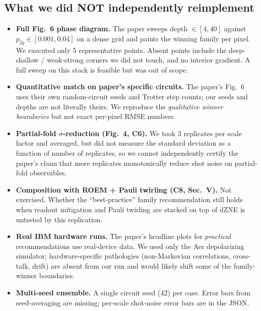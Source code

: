 \documentclass[11pt]{article}
\begin{document}
\subsection{What we did NOT independently reimplement}
\begin{itemize}
  \item \textbf{Full Fig.~6 phase diagram.} The paper sweeps depth $\in [4, 40]$
        against $p_{2q} \in [0.001, 0.04]$ on a dense grid and paints the winning
        family per pixel. We executed only 5 representative points. Absent points
        include the deep-shallow / weak-strong corners we did not touch, and no
        interior gradient. A full sweep on this stack is feasible but was out of
        scope.
  \item \textbf{Quantitative match on paper's specific circuits.} The paper's
        Fig.~6 uses their own random-circuit seeds and Trotter step counts; our
        seeds and depths are not literally theirs. We reproduce the
        \emph{qualitative winner boundaries} but not exact per-pixel RMSE numbers.
  \item \textbf{Partial-fold $\sigma$-reduction (Fig.~4, C6).} We took 3 replicates
        per scale factor and averaged, but did not measure the standard deviation
        as a function of number of replicates, so we cannot independently
        certify the paper's claim that more replicates monotonically reduce shot
        noise on partial-fold observables.
  \item \textbf{Composition with ROEM + Pauli twirling (C8, Sec.~V).} Not
        exercised. Whether the ``best-practice'' family recommendation still
        holds when readout mitigation and Pauli twirling are stacked on top of
        dZNE is untested by this replication.
  \item \textbf{Real IBM hardware runs.} The paper's headline plots for
        \emph{practical} recommendations use real-device data. We used only the
        Aer depolarizing simulator; hardware-specific pathologies
        (non-Markovian correlations, cross-talk, drift) are absent from our
        run and would likely shift some of the family-winner boundaries.
  \item \textbf{Multi-seed ensemble.} A single circuit seed (42) per case. Error
        bars from seed-averaging are missing; per-scale shot-noise error bars are
        in the JSON.
\end{itemize}
\end{document}
